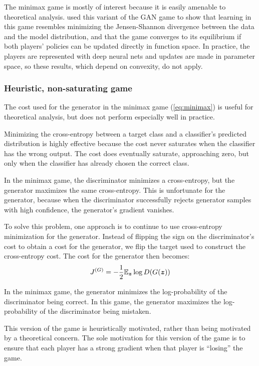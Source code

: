The minimax game is mostly of interest because it is easily amenable to theoretical analysis.
\citet{Goodfellow-et-al-NIPS2014-small} used this variant of the GAN game to show that learning in
this game resembles minimizing the Jensen-Shannon divergence between the data and the model distribution,
and that the game converges to its equilibrium if both players' policies can be updated directly in
function space.
In practice, the players are represented with deep neural nets and updates are made in parameter space,
so these results, which depend on convexity, do not apply.

\subsubsection{Heuristic, non-saturating game}

The cost used for the generator in the minimax game (\eqref{eq:minimax}) is useful for theoretical analysis,
but does not perform especially well in practice.

Minimizing the cross-entropy between a target class and a classifier's predicted distribution
is highly effective because the cost never saturates when the classifier has the wrong output.
The cost does eventually saturate, approaching zero, but only when the classifier has already
chosen the correct class.

In the minimax game, the discriminator minimizes a cross-entropy, but the generator maximizes
the same cross-entropy.
This is unfortunate for the generator, because when the discriminator successfully rejects
generator samples with high confidence, the generator's gradient vanishes.

To solve this problem, one approach is to continue to use cross-entropy minimization for the
generator.
Instead of flipping the sign on the discriminator's cost to obtain a cost for the generator,
we flip the target used to construct the cross-entropy cost.
The cost for the generator then becomes:
\[
  J^{(G)} = -\frac{1}{2} \mathbb{E}_{\bm{z}} \log D(G({\bm{z}}))
\]

In the minimax game, the generator minimizes the log-probability of the discriminator being correct.
In this game, the generator maximizes the log-probability of the discriminator being mistaken.

This version of the game is heuristically motivated, rather than being motivated by a theoretical
concern.
The sole motivation for this version of the game is to ensure that each player has a strong
gradient when that player is ``losing'' the game.

